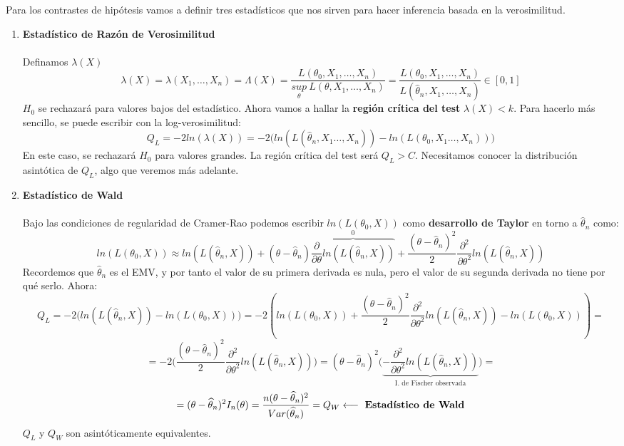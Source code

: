 Para los contrastes de hipótesis vamos a definir tres estadísticos que nos sirven para hacer inferencia basada en la verosimilitud.
\begin{enumerate}
    \item \textbf{Estadístico de Razón de Verosimilitud}\\\ \\
    Definamos $\lambda (X)$
    $$\lambda (X)=\lambda (X_1,\dots ,X_n)=\Lambda (X)=\frac{L(\theta_0, X_1,\dots,X_n)}{\underset{\theta}{sup}\ L(\theta,X_1,\dots,X_n)}=\frac{L(\theta_0, X_1,\dots,X_n)}{L(\widehat\theta_n, X_1,\dots,X_n)}\in [0,1]$$
    $H_0$ se rechazará para valores bajos del estadístico. 
    Ahora vamos a hallar la \textbf{región crítica del test} $\lambda (X)<k$. Para hacerlo más sencillo, se puede escribir con la log-verosimilitud:
    $$Q_L=-2ln(\lambda (X))=-2\big(ln(L(\widehat\theta_n,X_1\dots,X_n))-ln(L(\theta_0,X_1\dots,X_n))\big)$$
    En este caso, se rechazará $H_0$ para valores grandes. La región crítica del test será $Q_L>C$. 
    Necesitamos conocer la distribución asintótica de $Q_L$, algo que veremos más adelante.

    \item \textbf{Estadístico de Wald}\\\ \\
    Bajo las condiciones de regularidad de Cramer-Rao podemos escribir $ln(L(\theta_0,X))$ como \textbf{desarrollo de Taylor} en torno a $\widehat\theta_n$ como:
    $$ln(L(\theta_0,X))\approx ln(L(\widehat\theta_n,X))+(\theta-\widehat\theta_n)\overbrace{\frac{\partial}{\partial\theta}ln(L(\widehat\theta_n,X))}^{0}+\frac{(\theta-\widehat\theta_n)^2}{2}\frac{\partial^2}{\partial\theta^2}ln(L(\widehat\theta_n,X))$$
    Recordemos que $\widehat\theta_n$ es el EMV, y por tanto el valor de su primera derivada es nula, pero el valor de su segunda derivada no tiene por qué serlo.
Ahora:
    $$Q_L=-2\big(ln(L(\widehat\theta_n,X))-ln(L(\theta_0,X))\big)=-2(ln(L(\theta_0,X))+\frac{(\theta-\widehat\theta_n)^2}{2}\frac{\partial^2}{\partial\theta^2}ln(L(\widehat\theta_n,X))-ln(L(\theta_0,X)))=$$
    $$=-2\Big(\frac{(\theta-\widehat\theta_n)^2}{2}\frac{\partial^2}{\partial\theta^2}ln(L(\widehat\theta_n,X))\Big)=(\theta-\widehat\theta_n)^2\Big(\underbrace{-\frac{\partial^2}{\partial\theta^2}ln(L(\widehat\theta_n,X))}_{\text{I. de Fischer observada}}\Big)=$$
    $$=(\theta-\widehat\theta_n)^2I_n(\theta)=\frac{n(\theta-\widehat\theta_n)^2}{Var(\widehat\theta_n)}=Q_W\longleftarrow\text{ \textbf{Estadístico de Wald}}$$
    $Q_L$ y $Q_W$ son asintóticamente equivalentes.


\end{enumerate}
